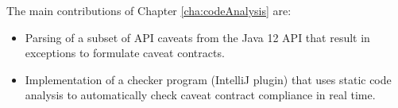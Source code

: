 \noindent
The main contributions of Chapter \ref{cha:codeAnalysis} are:
\begin{itemize}
	\item Parsing of a subset of API caveats from the Java 12 API that result in exceptions to formulate caveat contracts.
	\item Implementation of a checker program (IntelliJ plugin) that uses static code analysis to automatically check caveat contract compliance in real time.
\end{itemize}